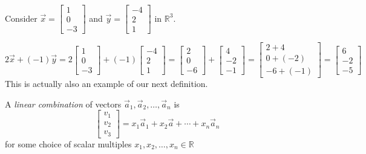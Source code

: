 \begin{example}
Consider  $\vec{x}=\begin{bmatrix}1\\ 0  \\ -3\end{bmatrix}$ and 
$\vec{y}=\begin{bmatrix}-4\\ 2 \\ 1\end{bmatrix}$ in $\mathbb{R}^3$.

\[
2\vec{x}+(-1)\vec{y}=
2\begin{bmatrix}1\\ 0  \\ -3\end{bmatrix}+
(-1)\begin{bmatrix}-4\\ 2 \\ 1\end{bmatrix}=
\begin{bmatrix}2\\ 0  \\ -6\end{bmatrix}+
\begin{bmatrix}4\\ -2 \\ -1\end{bmatrix}=
\begin{bmatrix}2+4\\ 0+(-2)  \\ -6+(-1)\end{bmatrix}=
\begin{bmatrix}6\\ -2  \\ -5\end{bmatrix}
\]
This is actually also an example of our next definition.
\end{example}
\begin{definition}
A \emph{linear combination} of vectors $\vec{a}_1, \vec{a}_2, \ldots, \vec{a}_n$ 
is 
\[
\begin{bmatrix}v_1 \\ v_2 \\ 
v_3\end{bmatrix}=x_1\vec{a}_1+x_2\vec{a}+\cdots+x_n\vec{a}_n
\]  
for some choice of scalar multiples $x_1,x_2, \ldots, x_n \in \mathbb{R}$
\end{definition}


